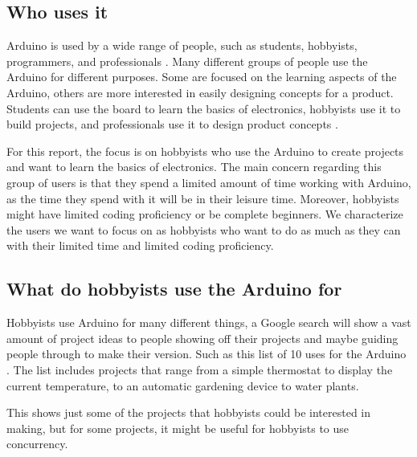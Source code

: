 \subsection{Who uses it}
Arduino is used by a wide range of people, such as students, hobbyists, programmers, and professionals \cite{WhatArduino}.
Many different groups of people use the Arduino for different purposes. Some are focused on the learning aspects of the Arduino, others are more interested in easily designing concepts for a product. Students can use the board to learn the basics of electronics, hobbyists use it to build projects, and professionals use it to design product concepts \cite{ArduinoUsedReal2018}.

For this report, the focus is on hobbyists who use the Arduino to create projects and want to learn the basics of electronics. The main concern regarding this group of users is that they spend a limited amount of time working with Arduino, as the time they spend with it will be in their leisure time. Moreover, hobbyists might have limited coding proficiency or be complete beginners. 
We characterize the users we want to focus on as hobbyists who want to do as much as they can with their limited time and limited coding proficiency.




\subsection{What do hobbyists use the Arduino for}

Hobbyists use Arduino for many different things, a Google search will show a vast amount of project ideas to people showing off their projects and maybe guiding people through to make their version.  Such as this list of 10 uses for the Arduino \cite{Top10Arduino2021}.
The list includes projects that range from a simple thermostat to display the current temperature, to an automatic gardening device to water plants.

This shows just some of the projects that hobbyists could be interested in making, but for some projects, it might be useful for hobbyists to use concurrency. 



